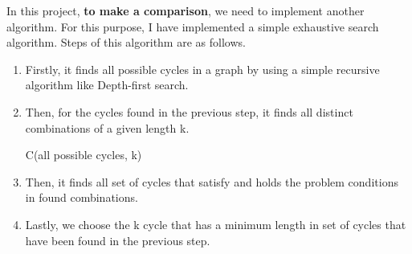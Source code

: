 \documentclass{beamer}
\begin{document}
\begin{chart3}

   In this project, \textbf{to make a comparison}, we need to implement another algorithm. For this purpose, I have implemented a simple exhaustive search algorithm. Steps of this algorithm are as follows.
\vspace{0.02\textheight}
\begin{enumerate}
        \item Firstly, it finds all possible cycles in a graph by using a simple recursive algorithm like Depth-first search.\cite{ten}
        \vspace{0.015\textheight}
        \item Then, for the cycles found in the previous step, it finds all distinct combinations of a given length k.\cite{eleven} \\
        \centerline{C(all possible cycles, k)} 
        \vspace{0.015\textheight}
        \item Then, it finds all set of cycles that satisfy and holds the problem conditions in found combinations.
        \vspace{0.015\textheight}
        \item Lastly, we choose the k cycle that has a minimum length in set of cycles that have been found in the previous step.
\end{enumerate}
			    
\end{chart3}
\end{document}
